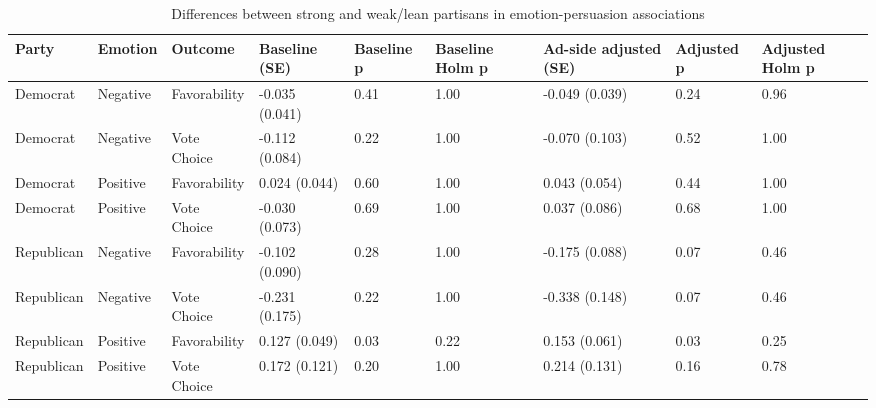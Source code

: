 \begin{table}[ht]
\centering
\begin{tabular}{lllllllll}
  \toprule
Party & Emotion & Outcome & Baseline (SE) & Baseline p & Baseline Holm p & Ad-side adjusted (SE) & Adjusted p & Adjusted Holm p \\ 
  \midrule
Democrat & Negative & Favorability & -0.035 (0.041) & 0.41 & 1.00 & -0.049 (0.039) & 0.24 & 0.96 \\ 
  Democrat & Negative & Vote Choice & -0.112 (0.084) & 0.22 & 1.00 & -0.070 (0.103) & 0.52 & 1.00 \\ 
  Democrat & Positive & Favorability & 0.024 (0.044) & 0.60 & 1.00 & 0.043 (0.054) & 0.44 & 1.00 \\ 
  Democrat & Positive & Vote Choice & -0.030 (0.073) & 0.69 & 1.00 & 0.037 (0.086) & 0.68 & 1.00 \\ 
  Republican & Negative & Favorability & -0.102 (0.090) & 0.28 & 1.00 & -0.175 (0.088) & 0.07 & 0.46 \\ 
  Republican & Negative & Vote Choice & -0.231 (0.175) & 0.22 & 1.00 & -0.338 (0.148) & 0.07 & 0.46 \\ 
  Republican & Positive & Favorability & 0.127 (0.049) & 0.03 & 0.22 & 0.153 (0.061) & 0.03 & 0.25 \\ 
  Republican & Positive & Vote Choice & 0.172 (0.121) & 0.20 & 1.00 & 0.214 (0.131) & 0.16 & 0.78 \\ 
   \bottomrule
\end{tabular}
\caption{Differences between strong and weak/lean partisans in emotion-persuasion associations} 
\label{tab:extension}
\end{table}
